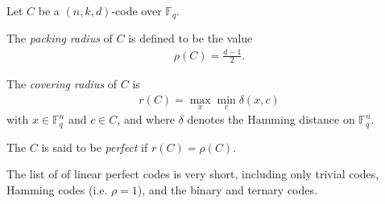 \documentclass[12pt]{article}
\newcommand{\mb}{\mathbb}
\newcommand{\<}{\langle}
\renewcommand{\>}{\rangle}
\begin{document}
Let $C$ be a  $(n,k,d)$-code over $\mb{F}_q$.

The \emph{packing radius} of $C$ is defined to be the value
\begin{align*}
\rho(C)=\frac{d-1}{2}.
\end{align*}

The \emph{covering radius} of $C$ is
\begin{align*}
r(C)=\max_x\min_c \delta(x,c)
\end{align*}
with $x\in \mb{F}_q^n$ and $c\in C$, and where $\delta$ denotes the Hamming distance on $\mb{F}_q^n$.

The  $C$ is said to be \emph{perfect} if $r(C)=\rho(C)$.

The list of  of linear perfect codes is very short, including only trivial codes, Hamming codes (i.e. $\rho=1$), and the binary and ternary  codes.
\end{document}
